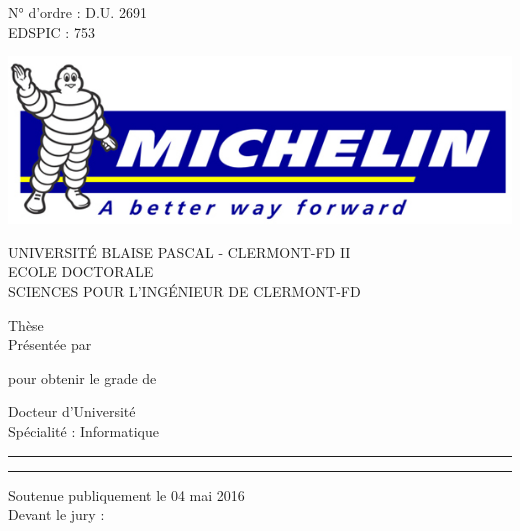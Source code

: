 %
\begin{titlepage}

    \begin{minipage}{0.3\textwidth}
        N° d'ordre : D.U. 2691\\
        EDSPIC : 753
    \end{minipage}
    \hfill
    \begin{minipage}{0.3\textwidth}
        \includegraphics[width=1.0\linewidth]{figures/michelin.jpg}
    \end{minipage}

	\center
    {\Large\uppercase{Universit\'e Blaise Pascal - Clermont-Fd II\\Ecole Doctorale\\Sciences pour l'Ing\'enieur de Clermont-Fd}\par}

    \hfill

    {\huge Thèse}\\
    Présentée par\\
    {\huge\thesisName\par}

    pour obtenir le grade de

    {\LARGE Docteur d'Université}\\
    Spécialité : Informatique\par

    \rule[5pt]{\textwidth}{.4pt}
    {\LARGE\thesisTitle \par}
    \rule[5pt]{\textwidth}{.4pt}\par

    \flushleft
    Soutenue publiquement le 04 mai 2016\\
    Devant le jury :


\end{titlepage}
